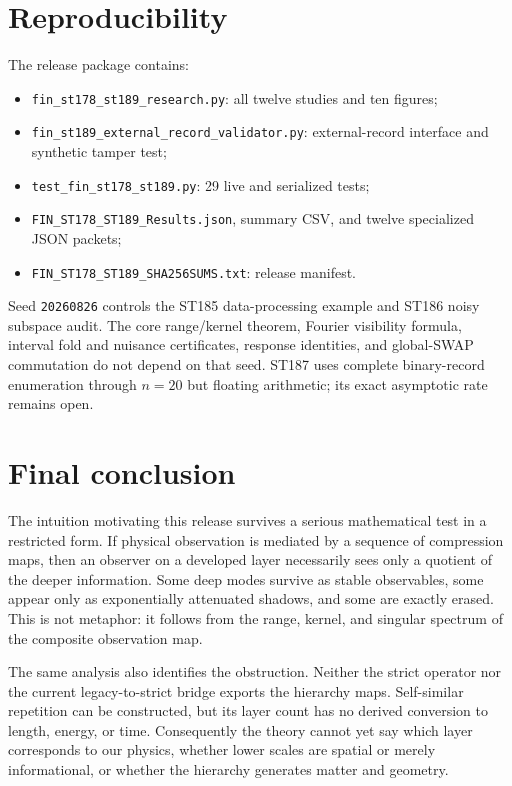 \documentclass[11pt,a4paper]{article}
\begin{document}
\section{Reproducibility}

The release package contains:
\begin{itemize}
\item \texttt{fin\_st178\_st189\_research.py}: all twelve studies and ten figures;
\item \texttt{fin\_st189\_external\_record\_validator.py}: external-record interface and synthetic tamper test;
\item \texttt{test\_fin\_st178\_st189.py}: 29 live and serialized tests;
\item \texttt{FIN\_ST178\_ST189\_Results.json}, summary CSV, and twelve specialized JSON packets;
\item \texttt{FIN\_ST178\_ST189\_SHA256SUMS.txt}: release manifest.
\end{itemize}

Seed \texttt{20260826} controls the ST185 data-processing example and ST186 noisy subspace audit. The core range/kernel theorem, Fourier visibility formula, interval fold and nuisance certificates, response identities, and global-SWAP commutation do not depend on that seed. ST187 uses complete binary-record enumeration through $n=20$ but floating arithmetic; its exact asymptotic rate remains open.

\section{Final conclusion}

The intuition motivating this release survives a serious mathematical test in a restricted form. If physical observation is mediated by a sequence of compression maps, then an observer on a developed layer necessarily sees only a quotient of the deeper information. Some deep modes survive as stable observables, some appear only as exponentially attenuated shadows, and some are exactly erased. This is not metaphor: it follows from the range, kernel, and singular spectrum of the composite observation map.

The same analysis also identifies the obstruction. Neither the strict operator nor the current legacy-to-strict bridge exports the hierarchy maps. Self-similar repetition can be constructed, but its layer count has no derived conversion to length, energy, or time. Consequently the theory cannot yet say which layer corresponds to our physics, whether lower scales are spatial or merely informational, or whether the hierarchy generates matter and geometry.
\end{document}
